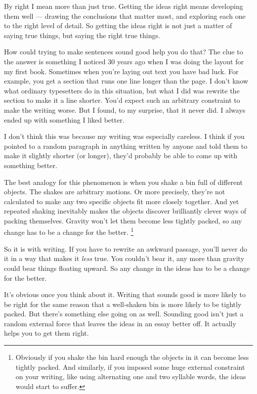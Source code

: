 \documentclass[12pt]{book}
\begin{document}
By right I mean more than just true. Getting the ideas right means
developing them well --- drawing the conclusions that matter most, and
exploring each one to the right level of detail. So getting the ideas
right is not just a matter of saying true things, but saying the right
true things.

How could trying to make sentences sound good help you do that? The clue
to the answer is something I noticed 30 years ago when I was doing the
layout for my first book. Sometimes when you're laying out text you have
bad luck. For example, you get a section that runs one line longer than
the page. I don't know what ordinary typesetters do in this situation,
but what I did was rewrite the section to make it a line shorter. You'd
expect such an arbitrary constraint to make the writing worse. But I
found, to my surprise, that it never did. I always ended up with
something I liked better.

I don't think this was because my writing was especially careless. I
think if you pointed to a random paragraph in anything written by anyone
and told them to make it slightly shorter (or longer), they'd probably
be able to come up with something better.

The best analogy for this phenomenon is when you shake a bin full of
different objects. The shakes are arbitrary motions. Or more precisely,
they're not calculated to make any two specific objects fit more closely
together. And yet repeated shaking inevitably makes the objects discover
brilliantly clever ways of packing themselves. Gravity won't let them
become less tightly packed, so any change has to be a change for the
better. \footnote{Obviously if you shake the bin hard enough the objects in it can
become less tightly packed. And similarly, if you imposed some huge
external constraint on your writing, like using alternating one and two
syllable words, the ideas would start to suffer.}

So it is with writing. If you have to rewrite an awkward passage, you'll
never do it in a way that makes it \emph{less} true. You couldn't bear
it, any more than gravity could bear things floating upward. So any
change in the ideas has to be a change for the better.

It's obvious once you think about it. Writing that sounds good is more
likely to be right for the same reason that a well-shaken bin is more
likely to be tightly packed. But there's something else going on as
well. Sounding good isn't just a random external force that leaves the
ideas in an essay better off. It actually helps you to get them right.
\end{document}
